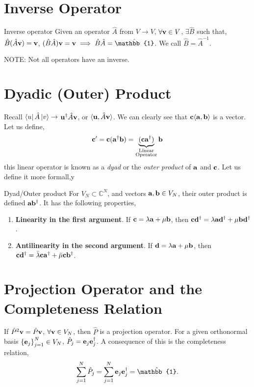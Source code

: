 \documentclass{book}
\def\innerproduct#1#2{{\langle #1},{#2 \rangle}}
\begin{document}
\section{Inverse Operator}
\begin{Definitions}{Inverse operator}{}
	Given an operator $\hat{A}$ from $V \to V$, $\forall \vb{v} \in V$, $\exists \hat{B}$ such that, $\hat{B}(\hat{A}\vb{v}) = \vb{v}$, $(\hat{B}\hat{A})\vb{v} = \vb{v} \implies \hat{B}\hat{A} = \hat{\mathbb{1}}$. We call $\hat{B} = \hat{A}^{-1}$.
\end{Definitions}
NOTE: Not all operators have an inverse.
\section{Dyadic (Outer) Product}
Recall $\bra{u}\hat{A}\ket{v} \to$ $\vb{u}^{\dag}\hat{A}\vb{v}$, or $\innerproduct{\vb{u}}{\hat{A}\vb{v}}$. We can clearly see that $\vb{c}\innerproduct{\vb{a}}{\vb{b}}$ is a vector. Let us define,
\begin{equation}
	\vb{c}' = \vb{c}(\vb{a}^{\dag}\vb{b}) = \underbrace{(\vb{c}\vb{a}^{\dag})}_{\substack{\text{Linear}\\\text{Operator}}}\vb{b}
\end{equation}
this linear operator is known as a \textit{dyad} or the \textit{outer product} of $\vb{a}$ and $\vb{c}$. Let us define it more formall,y

\begin{Definitions}{Dyad/Outer product}{}
	For $V_N \subset \mathbb{C}^N$, and vectors $\vb{a},\vb{b} \in V_N$, their outer product is defined $\vb{a}\vb{b}^{\dag}$. It has the following properties,
	\begin{enumerate}
		\item \textbf{Linearity in the first argument}. If $\vb{c} = \lambda \vb{a} + \mu \vb{b}$, then $\vb{c}\vb{d}^{\dag} = \lambda\vb{a}\vb{d}^{\dag} + \mu\vb{b}\vb{d}^{\dag}$.
		\item \textbf{Antilinearity in the second argument}. If $\vb{d} = \lambda \vb{a} + \mu \vb{b}$, then $\vb{c}\vb{d}^{\dag} = \bar{\lambda}\vb{c}\vb{a}^{\dag} + \bar{\mu}\vb{c}\vb{b}^{\dag}$.
	\end{enumerate}
\end{Definitions}
\section{Projection Operator and the Completeness Relation}
If $\hat{P}^2\vb{v} = \hat{P}\vb{v}$, $\forall \vb{v} \in V_N$, then $\hat{P}$ is a projection operator. For a given orthonormal basis $\left\{\vb{e}_j\right\}_{j=1}^N \in V_N$, $\hat{P}_j = \vb{e}_j\vb{e}_j^{\dag}$. A consequence of this is the completeness relation, 
\begin{equation}
	\sum_{j=1}^N\hat{P}_j = \sum_{j=1}^N \vb{e}_j\vb{e}_j^{\dag} = \hat{\mathbb{1}}.
\end{equation}
\end{document}
